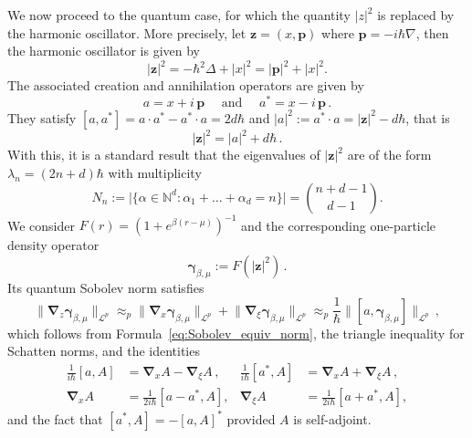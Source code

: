 \documentclass[11pt]{amsart}
\theoremstyle{plain}
\theoremstyle{definition}
\newcommand		{\N}		{\mathbb N}			%
\newcommand		{\cL}		{\mathcal L}		%
\newcommand		{\lt}			{\left}				%
\newcommand		{\rt}			{\right}			%
\renewcommand	{\(}			{\lt(}
\renewcommand	{\)}			{\rt)}
\newcommand		{\com}[1]		{\lt[{#1}\rt]}		%
\newcommand		{\n}[1]			{\lt\lvert #1 \rt\rvert}
\newcommand		{\bnrm}[1]		{\big\lVert #1\big\rVert}	%
\newcommand		{\bNrm}[2]		{\bnrm{#1}_{#2}}
\newcommand		{\opgam}	{{\boldsymbol{\gamma}}}	%
\newcommand		{\opp}		{\boldsymbol{p}}
\newcommand		{\opz}		{\mathbf{z}}%
\newcommand		{\Dh}		{\boldsymbol{\nabla}}	%
\newcommand		{\Dhx}[1]	{\Dh_{\!x} #1}			%
\newcommand		{\Dhv}[1]	{\Dh_{\!\xi} #1}		%
\newcommand		{\Dhz}[1]	{\Dh_{\!z} #1}
\begin{document}
	We now proceed to the quantum case, for which the quantity $\n{z}^2$ is replaced by the harmonic oscillator. More precisely, let $\opz = (x,\opp)$ where $\opp = -i\hbar\nabla$, then the harmonic oscillator is given by
	\begin{equation*}
		\n{\opz}^2 = -\hbar^2\Delta + \n{x}^2 = \n{\opp}^2 + \n{x}^2 .
	\end{equation*}
	The associated creation and annihilation operators are given by
	\begin{equation*}
		a = x + i\,\opp \quad \text{ and } \quad a^* = x - i \, \opp\,.
	\end{equation*}
	They satisfy $\com{a, a^*}= a\cdot a^*-a^*\cdot a= 2d\hbar$ and $\n{a}^2 := a^*\cdot a = \n{\opz}^2 - d\hbar$, that is
	\begin{equation*}
		\n{\opz}^2 = \n{a}^2 + d\hbar\,.
	\end{equation*}
	With this, it is a standard result that the eigenvalues of $\n{\opz}^2$ are of the form $\lambda_n = (2n+d) \hbar$ with multiplicity
	\begin{equation}\label{eq:multiplicity}
		N_n := \bigl|\{\alpha\in\N^d:\alpha_1+\dots+\alpha_d = n\}\bigr| = \binom{n+d-1}{d-1} .
	\end{equation} 
	We consider $F(r) = (1+e^{\beta(r-\mu)})^{-1}$ and the corresponding one-particle density operator
	\begin{equation*}
		\opgam_{\beta, \mu} := F(\n{\opz}^2)\, .
	\end{equation*}
	Its quantum Sobolev norm satisfies
	\begin{equation*}
		\bNrm{\Dhz \opgam_{\beta,\mu}}{\cL^p} \approx_p \bNrm{ \Dhx \opgam_{\beta,\mu} }{\cL^p} + \bNrm{\Dhv \opgam_{\beta,\mu}}{\cL^p} \approx_p  \frac{1}{\hbar} \bNrm{ [a,\opgam_{\beta, \mu}] }{\cL^p}\,,
	\end{equation*}
	which follows from Formula~\eqref{eq:Sobolev_equiv_norm}, the triangle inequality for Schatten norms, and the identities
	\begin{align*}
		\frac{1}{i\hbar}\com{a, A} &= \Dhx A - \Dhv A \, , & \frac{1}{i\hbar}\com{a^\ast, A} &= \Dhx A + \Dhv A \, ,
		\\
		\Dhx A &= \frac{1}{2i\hbar}\com{a-a^\ast, A} , & \Dhv A&=\frac{1}{2i\hbar}\com{a+a^\ast, A} ,
	\end{align*}
	and the fact that $\com{a^*, A} = -\com{a,A}^*$ provided $A$ is self-adjoint.
	
\end{document}
